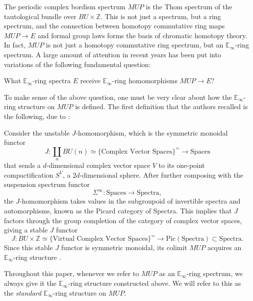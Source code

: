 The periodic complex bordism spectrum $MUP$ is the Thom spectrum of the tautological bundle over $BU \times \mathbb{Z}$.  This is not just a spectrum, but a ring spectrum, and the connection between homotopy commutative ring maps $MUP \longrightarrow E$ and formal group laws forms the basis of chromatic homotopy theory.  In fact, $MUP$ is not just a homotopy commutative ring spectrum, but an $\mathbb{E}_\infty$-ring spectrum.  A large amount of attention in recent years \cite{HopLaw,Ando,Walker,Moll,Zhu} has been put into variations of the following fundamental question:

\begin{qst}
What $\mathbb{E}_\infty$-ring spectra $E$ receive $\mathbb{E}_\infty$-ring homomorphisms $MUP \longrightarrow E$?
\end{qst}

To make sense of the above question, one must be very clear about how the $\mathbb{E}_\infty$-ring structure on $MUP$ is defined.  The first definition that the authors recalled is the following, due to \cite{BMMS}:

Consider the unstable $J$-homomorphism, which is the symmetric monoidal functor
$$J:\coprod_{n} BU(n) \simeq \{ \text{Complex Vector Spaces}\}^{\simeq} \longrightarrow \text{Spaces}$$
that sends a $d$-dimensional complex vector space $V$ to its one-point compactification $S^V$, a $2d$-dimensional sphere.  After further composing with the suspension spectrum functor $$\Sigma^{\infty}:\text{Spaces} \longrightarrow \text{Spectra},$$ the $J$-homomorphism takes values in the subgroupoid of invertible spectra and automorphisms, known as the Picard category of Spectra.  This implies that $J$ factors through the group completion of the category of complex vector spaces, giving a stable $J$ functor 
$$J:BU \times \mathbb{Z} \simeq \{ \text{Virtual Complex Vector Spaces} \}^{\simeq} \longrightarrow \text{Pic}(\text{Spectra}) \subset \text{Spectra}.$$
Since this stable $J$ functor is symmetric monoidal, its colimit $MUP$ acquires an $\mathbb{E}_\infty$-ring structure \cite{LMS, OmarToby}.

\begin{cnv}
Throughout this paper, whenever we refer to $MUP$ as an $\mathbb{E}_\infty$-ring spectrum, we always give it the $\mathbb{E}_\infty$-ring structure constructed above.  We will refer to this as the \textit{standard} $\mathbb{E}_\infty$-ring structure on $MUP$.
\end{cnv}

